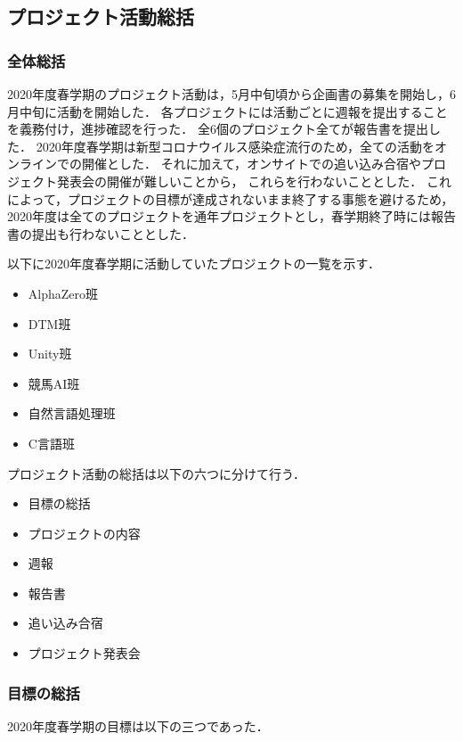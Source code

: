 \subsection*{プロジェクト活動総括}


\subsubsection*{全体総括}
2020年度春学期のプロジェクト活動は，5月中旬頃から企画書の募集を開始し，6月中旬に活動を開始した．
各プロジェクトには活動ごとに週報を提出することを義務付け，進捗確認を行った．
全6個のプロジェクト全てが報告書を提出した．
2020年度春学期は新型コロナウイルス感染症流行のため，全ての活動をオンラインでの開催とした．
それに加えて，オンサイトでの追い込み合宿やプロジェクト発表会の開催が難しいことから，
これらを行わないこととした．
これによって，プロジェクトの目標が達成されないまま終了する事態を避けるため，
2020年度は全てのプロジェクトを通年プロジェクトとし，春学期終了時には報告書の提出も行わないこととした．

以下に2020年度春学期に活動していたプロジェクトの一覧を示す．

\begin{itemize}
\item AlphaZero班
\item DTM班
\item Unity班
\item 競馬AI班
\item 自然言語処理班
\item C言語班
\end{itemize}

プロジェクト活動の総括は以下の六つに分けて行う．

\begin{itemize}
\item 目標の総括
\item プロジェクトの内容
\item 週報
\item 報告書
\item 追い込み合宿
\item プロジェクト発表会
\end{itemize}

\subsubsection*{目標の総括}
2020年度春学期の目標は以下の三つであった．


